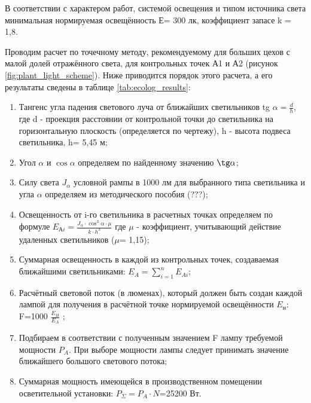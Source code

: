 В соответствии с характером работ, системой освещения и типом источника света минимальная нормируемая освещённость Е= 300 лк, коэффициент запасе k = 1,8.

Проводим расчет по точечному методу, рекомендуемому для больших цехов с малой долей отражённого света, для контрольных точек А1 и А2 (рисунок \ref{fig:plant_light_scheme}). Ниже приводится порядок этого расчета, а его результаты сведены в таблице \ref{tab:ecolog_results}:
\begin{enumerate}[1.]
	\item Тангенс угла падения светового луча от ближайших светильников tg $\alpha=\frac{d}{h}$, где d - проекция расстоянии от контрольной точки до светильника на горизонтальную плоскость (определяется по чертежу), h - высота подвеса светильника, h= 5,45 м;
	\item Угол $\alpha$ и $\cos \alpha$ определяем по найденному значению $\tg \alpha$;
	\item Силу света $J_\alpha$ условной рампы в 1000 лм для выбранного типа светильника и угла $\alpha$ определяем из методического пособия (???);
	\item Освещенность от i-го светильника в расчетных точках определяем по формуле $E_{Аi}=\frac{J_\alpha \cdot \cos^3 \alpha \cdot \mu}{k \cdot h^3 } $ где $\mu$ - коэффициент, учитывающий действие удаленных светильников ($\mu$= 1,15);
	\item Суммарная освещенность в каждой из контрольных точек, создаваемая ближайшими светильниками: $E_A = \sum_{i=1}^n E_{Ai} $;
	\item Расчётный световой поток (в люменах), который должен быть создан каждой лампой для получения в расчётной точке нормируемой освещённости $E_\text{н}$: F=1000 $\frac{E_H}{E_A}$ ;
	\item Подбираем в соответствии с полученным значением F лампу требуемой мощности $P_A$. При выборе мощности лампы следует принимать значение ближайшего большого светового потока;
	\item Суммарная мощность имеющейся в производственном помещении осветительной установки: $P_\Sigma = P_A \cdot N $=25200 Вт.
\end{enumerate}

